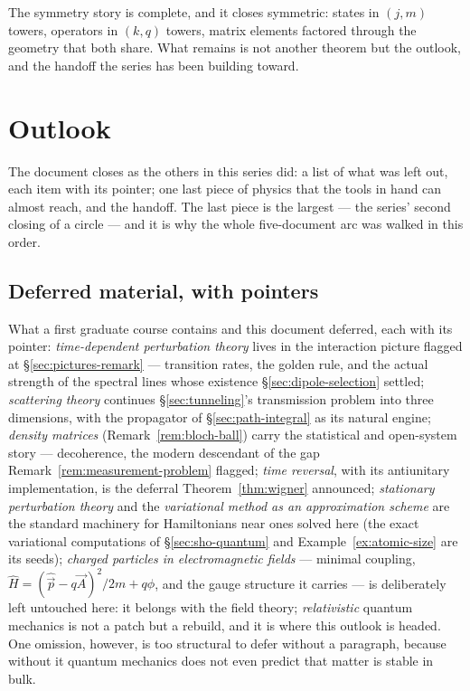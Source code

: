 \documentclass[11pt]{article}
\theoremstyle{plain}
\theoremstyle{definition}
\theoremstyle{remark}
\newcommand{\op}[1]{\hat{#1}}
\begin{document}
\medskip
\noindent
The symmetry story is complete, and it closes symmetric: states in
$(j, m)$ towers, operators in $(k, q)$ towers, matrix elements
factored through the geometry that both share. What remains is not
another theorem but the outlook, and the handoff the
series has been building toward.


\clearpage
\section{Outlook}
\label{sec:outlook}

The document closes as the others in this series did: a list of
what was left out, each item with its pointer; one last piece of
physics that the
tools in hand can almost reach, and the handoff. The last piece is
the largest --- the series' second closing of a circle --- and it
is why the whole five-document arc was walked in this order.

\subsection{Deferred material, with pointers}
\label{sec:ledger}

What a first graduate course contains and this document deferred,
each with its pointer:
\emph{time-dependent perturbation theory} lives in the interaction
picture flagged at \S\ref{sec:pictures-remark} --- transition
rates, the golden rule, and the actual strength of the spectral
lines whose existence \S\ref{sec:dipole-selection} settled;
\emph{scattering theory} continues \S\ref{sec:tunneling}'s
transmission problem into three dimensions, with the propagator of
\S\ref{sec:path-integral} as its natural engine;
\emph{density matrices} (Remark~\ref{rem:bloch-ball}) carry the
statistical and open-system story --- decoherence, the modern
descendant of the gap Remark~\ref{rem:measurement-problem} flagged;
\emph{time reversal}, with its antiunitary implementation, is the
deferral Theorem~\ref{thm:wigner} announced;
\emph{stationary perturbation theory} and the \emph{variational
method as an approximation scheme} are the standard machinery for
Hamiltonians near ones solved here (the exact variational
computations of \S\ref{sec:sho-quantum} and
Example~\ref{ex:atomic-size} are its seeds);
\emph{charged particles in electromagnetic fields} --- minimal
coupling, $\op H = (\op{\vec p} - q\vec A)^2/2m + q\phi$, and the
gauge structure it carries --- is deliberately left untouched here:
it belongs with the field theory;
\emph{relativistic} quantum mechanics is not a patch but a
rebuild, and it is where this outlook is headed. One omission,
however, is too structural to defer without a paragraph, because
without it quantum mechanics does not even predict that matter is
stable in bulk.
\end{document}
